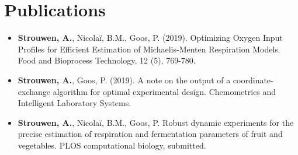 \chapter*{Publications} 
\begin{itemize}
	\item \textbf{Strouwen, A.}, Nicolaï, B.M., Goos, P. (2019). Optimizing Oxygen Input Profiles for Efficient Estimation of Michaelis-Menten Respiration Models. Food and Bioprocess Technology, 12 (5), 769-780.
	\item \textbf{Strouwen, A.}, Goos, P. (2019). A note on the output of a coordinate-exchange algorithm for optimal experimental design. Chemometrics and Intelligent Laboratory Systems.
	\item \textbf{Strouwen, A.}, Nicolaï, B.M., Goos, P. Robust dynamic experiments for the precise estimation of respiration and fermentation parameters of fruit and vegetables. PLOS computational biology, submitted.
\end{itemize}